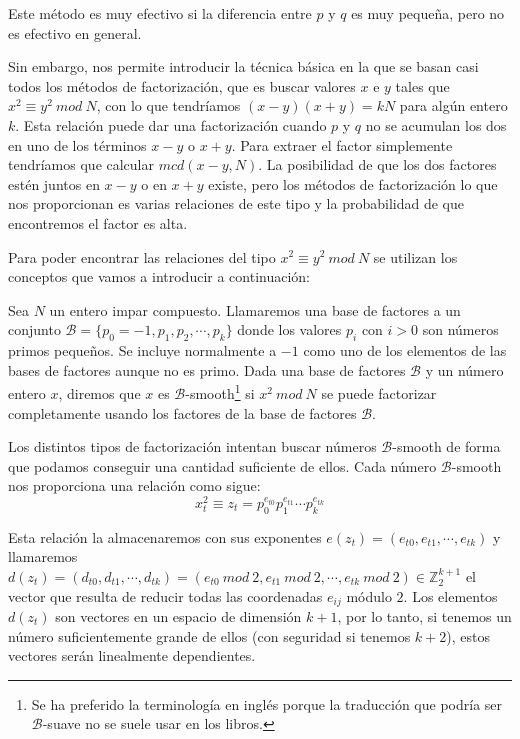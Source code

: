 Este m\'etodo es muy efectivo si la diferencia entre $p$ y $q$ es muy peque\~na, pero no
es efectivo en general.

Sin embargo, nos permite introducir la t\'ecnica b\'asica en la que se basan casi
todos los m\'etodos de factorizaci\'on, que es buscar valores $x$ e $y$ tales que
$x^2 \equiv y^2 ~mod~N$, con lo que tendr\'iamos $(x-y)(x+y) = kN$ para alg\'un entero $k$.
Esta relaci\'on puede dar una factorizaci\'on cuando $p$ y $q$ no se acumulan los dos en
uno de los t\'erminos $x-y$ o $x+y$. Para extraer el factor simplemente tendr\'iamos que
calcular $mcd(x-y,N)$. La posibilidad de que los dos factores est\'en juntos en $x-y$ o
en $x+y$ existe, pero los m\'etodos de factorizaci\'on lo que nos proporcionan es
varias relaciones de este tipo y la probabilidad de que encontremos el factor es alta.

Para poder encontrar las relaciones del tipo $x^2 \equiv y^2 ~mod~N$ se utilizan
los conceptos que vamos a introducir a continuaci\'on:

\begin{definition}
Sea $N$ un entero impar compuesto. Llamaremos una base de factores a un conjunto
${\mathcal B} = \{ p_0 = -1, p_1, p_2, \cdots, p_k \}$ donde los valores $p_i$ con $i>0$ son
n\'umeros primos peque\~nos. Se incluye normalmente a $-1$ como uno de los
elementos de las bases de factores aunque no es primo.
Dada una base de factores ${\mathcal B}$ y un n\'umero entero $x$, diremos
que $x$ es ${\mathcal B}$-smooth\footnote{Se ha preferido la terminolog\'ia en
ingl\'es porque la traducci\'on que podr\'ia ser ${\mathcal B}$-suave no se
suele usar en los libros.} si $x^2~mod~N$ se puede factorizar
completamente usando los factores de la base de factores ${\mathcal B}$.
\end{definition}

Los distintos tipos de factorizaci\'on intentan buscar n\'umeros ${\mathcal B}$-smooth
de forma que podamos conseguir una cantidad suficiente de ellos. Cada n\'umero ${\mathcal B}$-smooth nos
proporciona una relaci\'on como sigue:
\[ x_t^2 \equiv z_t = p_0^{e_{t0}} p_1^{e_{t1}} \cdots p_k^{e_{tk}} \]

Esta relaci\'on la almacenaremos con sus exponentes $e(z_t) = (e_{t0},e_{t1},\cdots,e_{tk})$ y llamaremos
$d(z_t) = (d_{t0},d_{t1},\cdots,d_{tk}) = (e_{t0}~mod~2,e_{t1}~mod~2,\cdots,e_{tk}~mod~2) \in
{\mathbb Z}_2^{k+1}$ el vector que resulta de reducir todas las coordenadas $e_{ij}$ m\'odulo $2$.
Los elementos $d(z_t)$ son vectores en un espacio de dimensi\'on $k+1$, por lo tanto,
si tenemos un n\'umero suficientemente grande de ellos (con seguridad si tenemos $k+2$), estos
vectores ser\'an linealmente dependientes.

